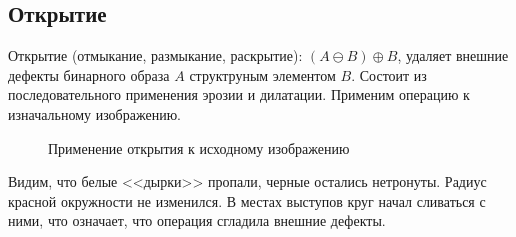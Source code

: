 \documentclass[a4paper, 12pt]{article}
\begin{document}
    \subsection{Открытие}
    Открытие (отмыкание, размыкание, раскрытие): $(A\ominus B)\oplus B$, удаляет внешние дефекты бинарного образа $A$ структруным
    элементом $B$. Состоит из последовательного применения эрозии и дилатации. Применим операцию к изначальному изображению.
    \begin{figure}[H]
        \centering
        \captionsetup{skip=0pt}
        \caption{Применение открытия к исходному изображению}
        \label{fig:op1}
    \end{figure}
    Видим, что белые <<дырки>> пропали, черные остались нетронуты. Радиус красной окружности не изменился. В местах
    выступов круг начал сливаться с ними, что означает, что операция сгладила внешние дефекты.
\end{document}
